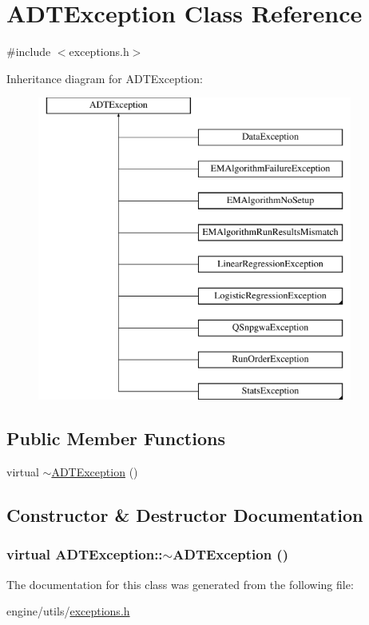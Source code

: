 \hypertarget{classADTException}{
\section{ADTException Class Reference}
\label{classADTException}
}


{\ttfamily \#include $<$exceptions.h$>$}

Inheritance diagram for ADTException:\begin{figure}[H]
\begin{center}
\leavevmode
\includegraphics[height=10cm]{classADTException}
\end{center}
\end{figure}
\subsection*{Public Member Functions}
\begin{DoxyCompactItemize}
\item 
virtual \hyperlink{classADTException_ab46c90cf660ee52426bcd8db57205e54}{$\sim$ADTException} ()
\end{DoxyCompactItemize}


\subsection{Constructor \& Destructor Documentation}
\hypertarget{classADTException_ab46c90cf660ee52426bcd8db57205e54}{
\subsubsection[{$\sim$ADTException}]{\setlength{\rightskip}{0pt plus 5cm}virtual ADTException::$\sim$ADTException ()}}
\label{classADTException_ab46c90cf660ee52426bcd8db57205e54}


The documentation for this class was generated from the following file:\begin{DoxyCompactItemize}
\item 
engine/utils/\hyperlink{exceptions_8h}{exceptions.h}\end{DoxyCompactItemize}
